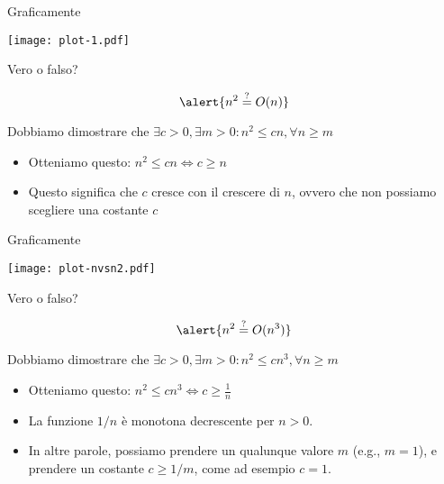 \begin{frame}{Graficamente}

\begin{center}
\vspace{-12pt}
\texttt{[image: plot-1.pdf]}
\end{center}

\end{frame}

\begin{frame}{Vero o falso?}
  
\begin{exampleblock}{}
\[ 
  \alert{n^2 \stackrel{?}{=} O(n)}
\]
\end{exampleblock}

\bigskip
Dobbiamo dimostrare che $\exists c>0, \exists m>0: n^2 \leq cn, \forall n \geq m$

\begin{itemize}
\item Otteniamo questo: $n^2 \leq cn \Leftrightarrow c \geq n$
\item Questo significa che $c$ cresce con il crescere di $n$, ovvero che non 
possiamo scegliere una costante $c$ 
\end{itemize}

\end{frame}

\begin{frame}{Graficamente}

\begin{center}
\vspace{-12pt}
\texttt{[image: plot-nvsn2.pdf]}
\end{center}

\end{frame}

\begin{frame}{Vero o falso?}

\begin{exampleblock}{}
\[
  \alert{n^2 \stackrel{?}{=} O(n^3)}
\]
\end{exampleblock}

\bigskip
Dobbiamo dimostrare che $\exists c>0, \exists m>0: n^2 \leq cn^3, \forall n \geq m$

\begin{itemize}
\item Otteniamo questo: $n^2 \leq cn^3 \Leftrightarrow c \geq \frac{1}{n}$
\item La funzione $1/n$ è monotona decrescente per $n>0$. 
\item In altre parole, possiamo prendere un qualunque valore $m$ (e.g., $m=1$), e prendere un costante $c \geq 1/m$, come ad esempio $c=1$.
\end{itemize}

\end{frame}







